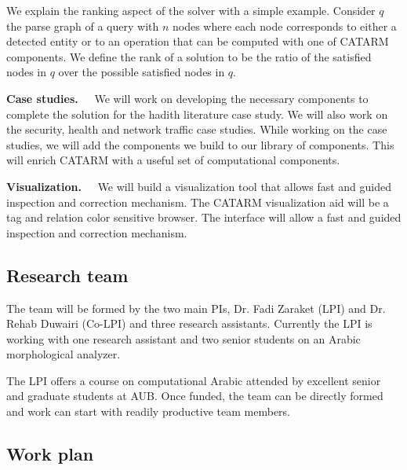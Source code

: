 \documentclass[12pt]{article}
\begin{document}
We explain the ranking aspect of the solver with a simple
example. 
Consider $q$ the parse graph of a query with $n$ nodes where 
each node corresponds to either a detected entity or
to an operation that can be computed with one of CATARM components. 
We define the rank of a solution to be the ratio of  the 
satisfied nodes in $q$ over the possible satisfied
nodes in $q$. 


{\bf Case studies.~~}
We will work on developing the necessary components to complete 
the solution for the hadith literature  case study. 
We will also work on the security, health and network traffic case studies.
While working on the case studies, we will add the components
we build to our library of components. 
This will enrich CATARM with a useful set of computational 
components. 

{\bf Visualization.~~}
We will build a visualization tool that allows fast 
and guided inspection and correction mechanism. 
The CATARM visualization aid will be a tag and relation color
sensitive browser.
The interface will allow a fast and guided inspection and 
correction mechanism.

\subsection{Research team}

The team will be formed by the two main PIs, Dr. Fadi Zaraket (LPI)
and Dr. Rehab Duwairi (Co-LPI) and three research assistants.
Currently the LPI is working with one research assistant 
and two senior students on an Arabic morphological analyzer. 

The LPI offers a course on computational Arabic attended
by excellent senior and graduate students at AUB. 
Once funded, the team can be directly formed and work can start
with readily productive team members. 

\subsection{Work plan}
\label{s:design:plan}
\end{document}
